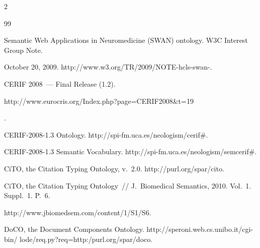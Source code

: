 \begin{multicols}{2}
{{\begin{thebibliography}{99}


Semantic Web Applications in Neuromedicine (SWAN) ontology. W3C Interest Group Note. 


October 20, 2009. {\sf http://www.w3.org/TR/2009/NOTE-hcls-swan-}.







CERIF 2008~--- Final Release (1.2). {\sf 


http://www.\linebreak eurocris.org/Index.php?page=CERIF2008\&t=19}.







CERIF-2008-1.3 Ontology. {\sf http://spi-fm.uca.es/\linebreak neologism/cerif\#}.







CERIF-2008-1.3 Semantic Vocabulary. {\sf http://\linebreak spi-fm.uca.es/neologism/semcerif\#}.









CiTO, the Citation Typing Ontology, v.~2.0. {\sf http://purl.org/spar/cito}.









CiTO, the Citation Typing Ontology~// J.~Biomedical Semantics, 2010. Vol.~1. Suppl.~1. P.~6. 


{\sf http://www.jbiomedsem.com/content/1/S1/S6}.









DoCO, the Document Components Ontology. {\sf http://speroni.web.cs.unibo.it/cgi-bin/ lode/req.py?req=http:/purl.org/spar/doco}.








\end{thebibliography}}}
\end{multicols}
